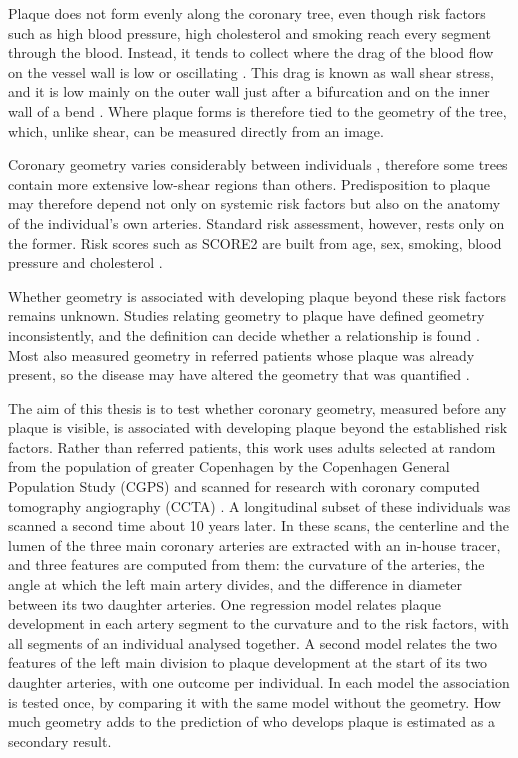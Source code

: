 Plaque does not form evenly along the coronary tree, even though risk factors such as high blood
pressure, high cholesterol and smoking reach every segment through the blood.
Instead, it tends to collect where the drag of the blood flow on the vessel wall is low or
oscillating \cite{chatzizisis2007ess}.
This drag is known as wall shear stress, and it is low mainly on the outer wall just after a
bifurcation and on the inner wall of a bend \cite{asakura1990flow}.
Where plaque forms is therefore tied to the geometry of the tree, which, unlike shear, can be
measured directly from an image.

Coronary geometry varies considerably between individuals \cite{temov2016bifurcation}, therefore some
trees contain more extensive low-shear regions than others.
Predisposition to plaque may therefore depend not only on systemic risk factors but also on the
anatomy of the individual's own arteries.
Standard risk assessment, however, rests only on the former.
Risk scores such as SCORE2 are built from age, sex, smoking, blood pressure and cholesterol
\cite{score2_2021}.

Whether geometry is associated with developing plaque beyond these risk factors remains unknown.
Studies relating geometry to plaque have defined geometry inconsistently, and the definition can
decide whether a relationship is found \cite{cui2017bifurcation,kashyap2022tortuosity}.
Most also measured geometry in referred patients whose plaque was already present, so the disease
may have altered the geometry that was quantified \cite{han2022plaque}.

The aim of this thesis is to test whether coronary geometry, measured before any plaque is visible,
is associated with developing plaque beyond the established risk factors.
Rather than referred patients, this work uses adults selected at random from the population of
greater Copenhagen by the Copenhagen General Population Study (CGPS) and scanned for research with
coronary computed tomography angiography (CCTA) \cite{fuchs2023cgps}.
A longitudinal subset of these individuals was scanned a second time about 10 years later.
In these scans, the centerline and the lumen of the three main coronary arteries are extracted with
an in-house tracer, and three features are computed from them: the curvature of the arteries, the
angle at which the left main artery divides, and the difference in diameter between its two
daughter arteries.
One regression model relates plaque development in each artery segment to the curvature and to the
risk factors, with all segments of an individual analysed together.
A second model relates the two features of the left main division to plaque development at the start
of its two daughter arteries, with one outcome per individual.
In each model the association is tested once, by comparing it with the same model without the
geometry.
How much geometry adds to the prediction of who develops plaque is estimated as a secondary result.

